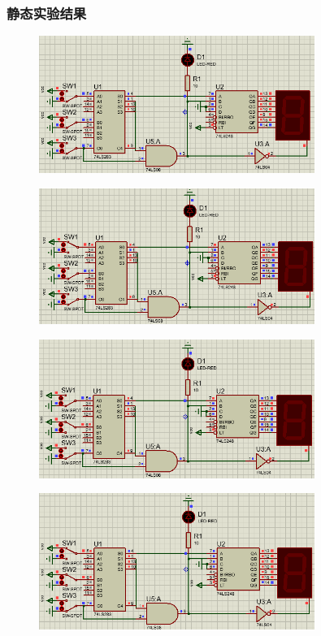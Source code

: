 \documentclass[UTF8, a4paper, 11pt]{article}
\begin{document}
\subsubsection{静态实验结果}
\begin{figure}[H]
    \centering
    \includegraphics[width=0.8\textwidth]{000.png}
\end{figure}
\begin{figure}[H]
    \centering
    \includegraphics[width=0.8\textwidth]{001.png}
\end{figure}
\begin{figure}[H]
    \centering
    \includegraphics[width=0.8\textwidth]{010.png}
\end{figure}
\begin{figure}[H]
    \centering
    \includegraphics[width=0.8\textwidth]{011.png}
\end{figure}
\end{document}
